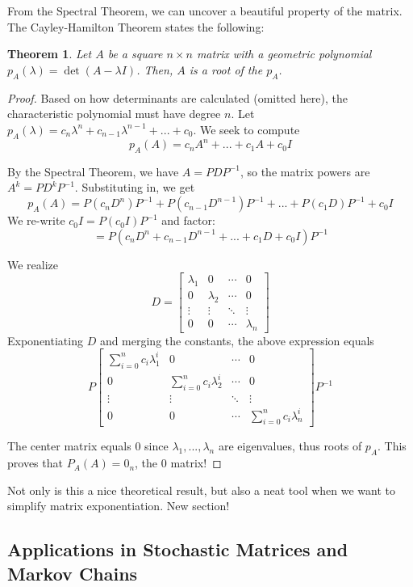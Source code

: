 \documentclass{article}
\newtheorem{theorem}{Theorem}[section]
\begin{document}
    From the Spectral Theorem, we can uncover a beautiful property of the matrix. The Cayley-Hamilton Theorem states the following: 
    \begin{theorem}
        Let $A$ be a square $n \times n$ matrix with a geometric polynomial $p_A(\lambda) = \det(A - \lambda I)$. Then, $A$ is a root of the $p_A$. 
    \end{theorem}

    \begin{proof}
        Based on how determinants are calculated (omitted here), the characteristic polynomial must have degree $n$. Let $p_A(\lambda) = c_n\lambda^n + c_{n-1}\lambda^{n-1} + ... + c_0$. We seek to compute $$p_A(A) = c_nA^n + ... + c_1A + c_0I$$

        \noindent By the Spectral Theorem, we have $A = PDP^{-1}$, so the matrix powers are $A^k = PD^kP^{-1}$. Substituting in, we get 
        $$ p_A(A) = P(c_nD^n)P^{-1} + P(c_{n-1}D^{n-1})P^{-1} + ... + P(c_1D)P^{-1} + c_0I$$
        We re-write $c_0I = P(c_0I)P^{-1}$ and factor: 
        $$ = P(c_nD^n + c_{n-1}D^{n-1} + ... + c_1D+c_0I)P^{-1}$$

        \noindent We realize 
        $$ D = \begin{bmatrix}
\lambda_1 & 0        & \cdots & 0 \\
0 & \lambda_2  & \cdots & 0 \\
\vdots  & \vdots   & \ddots & \vdots \\
0 & 0 & \cdots & \lambda_n
\end{bmatrix}$$
        Exponentiating $D$ and merging the constants, the above expression equals 
        $$ P\begin{bmatrix}
\sum_{i=0}^{n} c_i\lambda_1^i & 0        & \cdots & 0 \\
0 & \sum_{i=0}^{n} c_i\lambda_2^i  & \cdots & 0 \\
\vdots  & \vdots   & \ddots & \vdots \\
0 & 0 & \cdots & \sum_{i=0}^{n} c_i\lambda_n^i
\end{bmatrix} P^{-1}$$

        The center matrix equals $0$ since $\lambda_1,...,\lambda_n$ are eigenvalues, thus roots of $p_A$. This proves that $P_A(A) = 0_n$, the 0 matrix! 
    \end{proof}

    \noindent Not only is this a nice theoretical result, but also a neat tool when we want to simplify matrix exponentiation. New section! 

    \subsection{Applications in Stochastic Matrices and Markov Chains}
\end{document}
